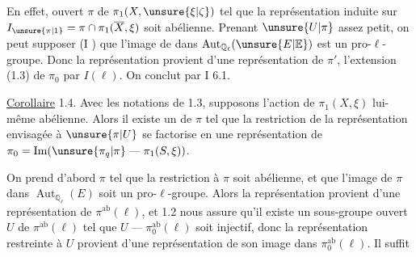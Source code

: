 En effet,   ouvert $\pi$ de $\pi_1(X,\unsure{\xi|\zeta})$ tel que la représentation induite sur $I_{\unsure{\pi|1}}=\pi\cap\pi_1(\overline X,\xi)$ soit abélienne. Prenant $\unsure{U|\pi}$ assez petit, on peut supposer (I \quad) que  l'image de \deleted{\unsure{$\pi$}} dans $\operatorname{Aut}_{\mathbb{Q}_\ell}(\unsure{E|\mathbb{E}})$ est un pro-$\ell$-groupe. Donc la représentation  provient d'une représentation de $\pi'$,  l'extension (1.3) de $\pi_0$ par $I(\ell)$. On conclut par I 6.1.

\uline{Corollaire} 1.4. Avec les notations de 1.3, supposons l'action de $\pi_1(X,\xi)$ lui-même   abélienne. Alors    il existe un    de $\pi$ tel que la restriction de la représentation envisagée à $\unsure{\pi|U}$  se factorise en une représentation de  $\pi_0=\operatorname{Im}(\unsure{\pi_q|\pi}\mathrel{\text{---}}\pi_1(S,\xi))$.


On prend  d'abord $\pi$ tel que la restriction à $\pi$ soit abélienne,  et que  l'image de $\pi$ dans $\operatorname{Aut}_{\mathbb{Q}_\ell}(E)$ soit un pro-$\ell$-groupe. Alors la représentation provient d'une représentation de $\pi^{\mathrm{ab}}(\ell)$, et  1.2 nous assure qu'il existe un sous-groupe ouvert $U$ de $\pi^{\mathrm{ab}}(\ell)$ tel que $U\mathrel{\text{---}}\pi_0^{\mathrm{ab}}(\ell)$ soit injectif, donc la représentation restreinte à $U$ provient d'une représentation de son image dans $\pi_0^{\mathrm{ab}}(\ell)$. Il suffit
